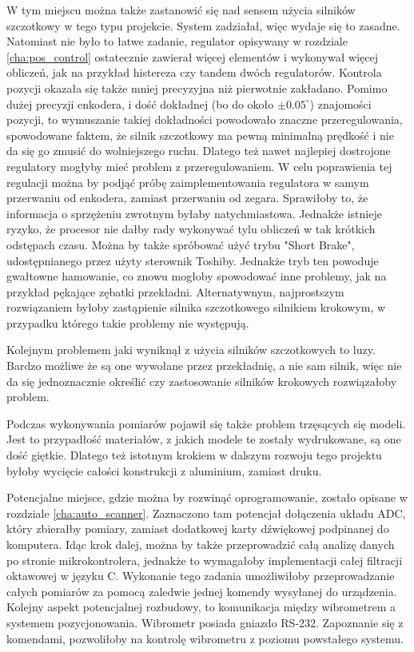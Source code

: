 W tym miejscu można także zastanowić się nad sensem użycia silników szczotkowy w tego typu projekcie. System zadziałał, więc wydaje się to zasadne. Natomiast nie było to łatwe zadanie, regulator opisywany w rozdziale \ref{cha:pos_control} ostatecznie zawierał więcej elementów i wykonywał więcej obliczeń, jak na przykład histereza czy tandem dwóch regulatorów. Kontrola pozycji okazała się także mniej precyzyjna niż pierwotnie zakładano. Pomimo dużej precyzji enkodera, i dość dokładnej (bo do około $\pm0.05^{\circ}$) znajomości pozycji, to wymuszanie takiej dokładności powodowało znaczne przeregulowania, spowodowane faktem, że silnik szczotkowy ma pewną minimalną prędkość i nie da się go zmusić do wolniejszego ruchu. Dlatego też nawet najlepiej dostrojone regulatory mogłyby mieć problem z przeregulowaniem. W celu poprawienia tej regulacji można by podjąć próbę zaimplementowania regulatora w samym przerwaniu od enkodera, zamiast przerwaniu od zegara. Sprawiłoby to, że informacja o sprzężeniu zwrotnym byłaby natychmiastowa. Jednakże istnieje ryzyko, że procesor nie dałby rady wykonywać tylu obliczeń w tak krótkich odstępach czasu. Można by także spróbować użyć trybu "Short Brake", udostępnianego przez użyty sterownik Toshiby. Jednakże tryb ten powoduje gwałtowne hamowanie, co znowu mogłoby spowodować inne problemy, jak na przykład pękające zębatki przekładni. Alternatywnym, najprostszym rozwiązaniem byłoby zastąpienie silnika szczotkowego silnikiem krokowym, w przypadku którego takie problemy nie występują.

Kolejnym problemem jaki wyniknął z użycia silników szczotkowych to luzy. Bardzo możliwe że są one wywołane przez przekładnię, a nie sam silnik, więc nie da się jednoznacznie określić czy zastosowanie silników krokowych rozwiązałoby problem.

Podczas wykonywania pomiarów pojawił się także problem trzęsących się modeli. Jest to przypadłość materiałów, z jakich modele te zostały wydrukowane, są one dość giętkie. Dlatego też istotnym krokiem w dalszym rozwoju tego projektu byłoby wycięcie całości konstrukcji z aluminium, zamiast druku.

Potencjalne miejsce, gdzie można by rozwinąć oprogramowanie, zostało opisane w rozdziale \ref{cha:auto_scanner}. Zaznaczono tam potencjał dołączenia układu ADC, który zbierałby pomiary, zamiast dodatkowej karty dźwiękowej podpinanej do komputera. Idąc krok dalej, można by także przeprowadzić całą analizę danych po stronie mikrokontrolera, jednakże to wymagałoby implementacji całej filtracji oktawowej w języku C. Wykonanie tego zadania umożliwiłoby przeprowadzanie całych pomiarów za pomocą zaledwie jednej komendy wysyłanej do urządzenia. Kolejny aspekt potencjalnej rozbudowy, to komunikacja między wibrometrem a systemem pozycjonowania. Wibrometr posiada gniazdo RS-232. Zapoznanie się z komendami, pozwoliłoby na kontrolę wibrometru z poziomu powstałego systemu.
